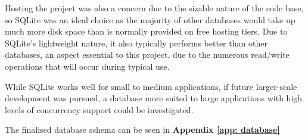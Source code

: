 \documentclass[l4proj.tex]{subfiles}
\begin{document}
Hosting the project was also a concern due to the sizable nature of the code base, so SQLite was an ideal choice as the majority of other databases would take up much more disk space than is normally provided on free hosting tiers. Due to SQLite's lightweight nature, it also typically performs better than other databases, an aspect essential to this project, due to the numerous read/write operations that will occur during typical use.

While SQLite works well for small to medium applications, if future larger-scale development was pursued, a database more suited to large applications with high levels of concurrency support could be investigated.

The finalised database schema can be seen in \textbf{Appendix \ref{app: database}}
\end{document}
